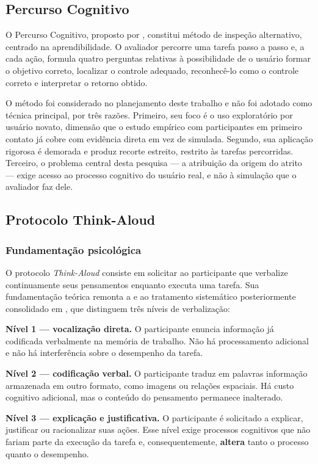 \subsection{Percurso Cognitivo}

O Percurso Cognitivo, proposto por , constitui método de
inspeção alternativo, centrado na aprendibilidade. O avaliador percorre uma
tarefa passo a passo e, a cada ação, formula quatro perguntas relativas à
possibilidade de o usuário formar o objetivo correto, localizar o controle
adequado, reconhecê-lo como o controle correto e interpretar o retorno obtido.

O método foi considerado no planejamento deste trabalho e não foi adotado como
técnica principal, por três razões. Primeiro, seu foco é o uso exploratório por
usuário novato, dimensão que o estudo empírico com participantes em primeiro
contato já cobre com evidência direta em vez de simulada. Segundo, sua aplicação
rigorosa é demorada e produz recorte estreito, restrito às tarefas percorridas.
Terceiro, o problema central desta pesquisa --- a atribuição da origem do atrito
--- exige acesso ao processo cognitivo do usuário real, e não à simulação que o
avaliador faz dele.

\subsection{Protocolo Think-Aloud}
\label{sec:thinkaloud}

\subsubsection{Fundamentação psicológica}

O protocolo \textit{Think-Aloud} consiste em solicitar ao participante que
verbalize continuamente seus pensamentos enquanto executa uma tarefa. Sua
fundamentação teórica remonta a  e ao tratamento
sistemático posteriormente consolidado em , que
distinguem três níveis de verbalização:

\begin{alineas}
  \item \textbf{Nível 1 --- vocalização direta.} O participante enuncia
  informação já codificada verbalmente na memória de trabalho. Não há
  processamento adicional e não há interferência sobre o desempenho da tarefa.

  \item \textbf{Nível 2 --- codificação verbal.} O participante traduz em
  palavras informação armazenada em outro formato, como imagens ou relações
  espaciais. Há custo cognitivo adicional, mas o conteúdo do pensamento permanece
  inalterado.

  \item \textbf{Nível 3 --- explicação e justificativa.} O participante é
  solicitado a explicar, justificar ou racionalizar suas ações. Esse nível exige
  processos cognitivos que não fariam parte da execução da tarefa e,
  consequentemente, \textbf{altera} tanto o processo quanto o desempenho.
\end{alineas}

